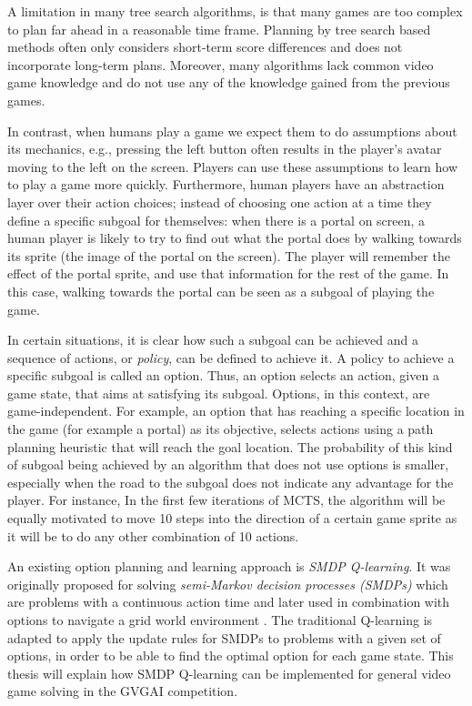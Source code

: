 A limitation in many tree search algorithms, is that many games are too complex
to plan far ahead in a reasonable time frame. Planning by tree search based
methods often only considers short-term score differences and does not
incorporate long-term plans. Moreover, many algorithms lack common video game
knowledge and do not use any of the knowledge gained from the previous games.

In contrast, when humans play a game we expect them to do assumptions about its
mechanics, e.g., pressing the left button often results in the player's avatar
moving to the left on the screen. Players can use these assumptions to learn how
to play a game more quickly. Furthermore, human players have an abstraction
layer over their action choices; instead of choosing one action at a time they
define a specific subgoal for themselves: when there is a portal
on screen, a human player is likely to try to find out what the portal does by
walking towards its sprite (the image of the portal on the screen). The player
will remember the effect of the portal sprite, and use that information for the
rest of the game. In this case, walking towards the portal can be seen as a
subgoal of playing the game.

In certain situations, it is clear how such a subgoal can be achieved and a
sequence of actions, or \emph{policy}, can be defined to achieve it. A policy to
achieve a specific subgoal is called an option. Thus, an option selects an
action, given a game state, that aims at satisfying its subgoal. Options, in
this context, are game-independent. For example, an option that has reaching a
specific location in the game (for example a portal) as its objective, selects
actions using a path planning heuristic that will reach the goal location. 
The probability of this kind of subgoal being achieved by an algorithm that
does not use options is smaller, especially when the road to the subgoal does
not indicate any advantage for the player. For instance, In the first few
iterations of MCTS, the algorithm will be equally motivated to move 10 steps
into the direction of a certain game sprite as it will be to do any other
combination of 10 actions. 

An existing option planning and learning approach is \emph{SMDP Q-learning}. It
was originally proposed for solving \emph{semi-Markov decision processes
(SMDPs)} which are problems with a continuous action time
\cite{duff1995reinforcement} and later used in combination with
options to navigate a grid world environment \cite{sutton1999between,
stolle2002learning}.  
The traditional Q-learning is adapted to apply the update rules for SMDPs to
problems with a given set of options, in order to be able to find the optimal
option for each game state. This thesis will explain how SMDP Q-learning can be
implemented for general video game solving in the GVGAI competition.  

